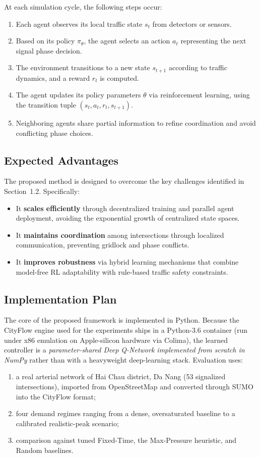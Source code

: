 \documentclass[12pt]{report} %
\begin{document}
At each simulation cycle, the following steps occur:
\begin{enumerate}
    \item Each agent observes its local traffic state $s_t$ from detectors or sensors.
    \item Based on its policy $\pi_{\theta}$, the agent selects an action $a_t$ representing the next signal phase decision.
    \item The environment transitions to a new state $s_{t+1}$ according to traffic dynamics, and a reward $r_t$ is computed.
    \item The agent updates its policy parameters $\theta$ via reinforcement learning, using the transition tuple $(s_t, a_t, r_t, s_{t+1})$.
    \item Neighboring agents share partial information to refine coordination and avoid conflicting phase choices.
\end{enumerate}

\subsection{Expected Advantages}

The proposed method is designed to overcome the key challenges identified in Section~1.2. Specifically:
\begin{itemize}
    \item It \textbf{scales efficiently} through decentralized training and parallel agent deployment, avoiding the exponential growth of centralized state spaces.
    \item It \textbf{maintains coordination} among intersections through localized communication, preventing gridlock and phase conflicts.
    \item It \textbf{improves robustness} via hybrid learning mechanisms that combine model-free RL adaptability with rule-based traffic safety constraints.
\end{itemize}

\subsection{Implementation Plan}

The core of the proposed framework is implemented in Python. Because the CityFlow engine used for the experiments ships in a Python-3.6 container (run under x86 emulation on Apple-silicon hardware via Colima), the learned controller is a \emph{parameter-shared Deep Q-Network implemented from scratch in NumPy} rather than with a heavyweight deep-learning stack. Evaluation uses:
\begin{enumerate}
    \item a real arterial network of Hai Chau district, Da Nang (53 signalized intersections), imported from OpenStreetMap and converted through SUMO into the CityFlow format;
    \item four demand regimes ranging from a dense, oversaturated baseline to a calibrated realistic-peak scenario;
    \item comparison against tuned Fixed-Time, the Max-Pressure heuristic, and Random baselines.
\end{enumerate}
\end{document}

